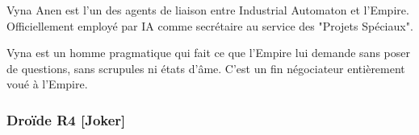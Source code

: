 Vyna Anen est l’un des agents de liaison entre Industrial Automaton et l’Empire. Officiellement employé par IA comme secrétaire au service des "Projets Spéciaux". 

Vyna est un homme pragmatique qui fait ce que l’Empire lui demande sans poser de questions, sans scrupules ni états d’âme. C’est un fin négociateur entièrement voué à l’Empire.\\


\subsubsection{Droïde R4 [Joker]}

